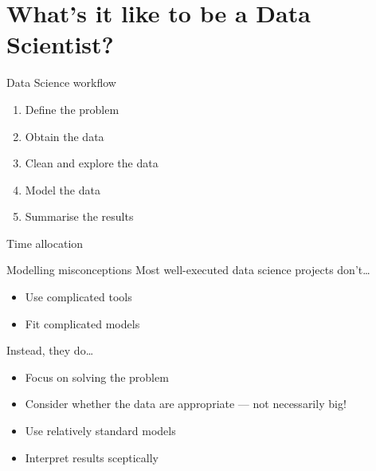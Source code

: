 \section{What's it like to be a Data Scientist?}

\begin{frame}{Data Science workflow}
    \begin{enumerate}
        \setlength{\itemsep}{0.75em}
        \item Define the problem
        \item Obtain the data
        \item Clean and explore the data
        \item Model the data
        \item Summarise the results
    \end{enumerate}
\end{frame}

\begin{frame}{Time allocation}
\end{frame}

\begin{frame}{Modelling misconceptions}
    Most well\hyp{}executed data science projects don't\ldots\vspace{-1ex}
    \begin{itemize}
        \item Use complicated tools
        \item Fit complicated models
    \end{itemize}
    \vfill
    Instead, they do\ldots\vspace{-1ex}
    \begin{itemize}
        \item \alert{Focus on solving the problem}
        \item Consider whether the data are appropriate --- not necessarily big!
        \item Use relatively standard models
        \item Interpret results sceptically
    \end{itemize}
\end{frame}

